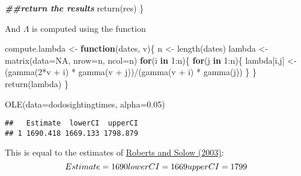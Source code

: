 \documentclass[
]{article}
\newenvironment{Shaded}{\begin{snugshade}}{\end{snugshade}}
\newcommand{\AttributeTok}[1]{\textcolor[rgb]{0.77,0.63,0.00}{#1}}
\newcommand{\ConstantTok}[1]{\textcolor[rgb]{0.00,0.00,0.00}{#1}}
\newcommand{\ControlFlowTok}[1]{\textcolor[rgb]{0.13,0.29,0.53}{\textbf{#1}}}
\newcommand{\DecValTok}[1]{\textcolor[rgb]{0.00,0.00,0.81}{#1}}
\newcommand{\DocumentationTok}[1]{\textcolor[rgb]{0.56,0.35,0.01}{\textbf{\textit{#1}}}}
\newcommand{\FloatTok}[1]{\textcolor[rgb]{0.00,0.00,0.81}{#1}}
\newcommand{\FunctionTok}[1]{\textcolor[rgb]{0.00,0.00,0.00}{#1}}
\newcommand{\NormalTok}[1]{#1}
\newcommand{\OtherTok}[1]{\textcolor[rgb]{0.56,0.35,0.01}{#1}}
\newcommand{\SpecialCharTok}[1]{\textcolor[rgb]{0.00,0.00,0.00}{#1}}
\begin{document}
\begin{Shaded}
\begin{Highlighting}[]
    \DocumentationTok{\#\#return the results}
    \FunctionTok{return}\NormalTok{(res)}
\NormalTok{\}}
\end{Highlighting}
\end{Shaded}

And \(\Lambda\) is computed using the function

\begin{Shaded}
\begin{Highlighting}[]
\NormalTok{compute.lambda }\OtherTok{\textless{}{-}} \ControlFlowTok{function}\NormalTok{(dates, v)\{}
\NormalTok{  n      }\OtherTok{\textless{}{-}} \FunctionTok{length}\NormalTok{(dates)}
\NormalTok{  lambda }\OtherTok{\textless{}{-}} \FunctionTok{matrix}\NormalTok{(}\AttributeTok{data=}\ConstantTok{NA}\NormalTok{, }\AttributeTok{nrow=}\NormalTok{n, }\AttributeTok{ncol=}\NormalTok{n)}
  \ControlFlowTok{for}\NormalTok{(i }\ControlFlowTok{in} \DecValTok{1}\SpecialCharTok{:}\NormalTok{n)\{}
    \ControlFlowTok{for}\NormalTok{(j }\ControlFlowTok{in} \DecValTok{1}\SpecialCharTok{:}\NormalTok{n)\{}
\NormalTok{      lambda[i,j] }\OtherTok{\textless{}{-}}\NormalTok{ (}\FunctionTok{gamma}\NormalTok{(}\DecValTok{2}\SpecialCharTok{*}\NormalTok{v }\SpecialCharTok{+}\NormalTok{ i) }\SpecialCharTok{*} \FunctionTok{gamma}\NormalTok{(v }\SpecialCharTok{+}\NormalTok{ j))}\SpecialCharTok{/}\NormalTok{(}\FunctionTok{gamma}\NormalTok{(v }\SpecialCharTok{+}\NormalTok{ i) }\SpecialCharTok{*} \FunctionTok{gamma}\NormalTok{(j))}
\NormalTok{    \}}
\NormalTok{  \}}
  \FunctionTok{return}\NormalTok{(lambda)}
\NormalTok{\}}
\end{Highlighting}
\end{Shaded}

\begin{Shaded}
\begin{Highlighting}[]
\FunctionTok{OLE}\NormalTok{(}\AttributeTok{data=}\NormalTok{dodosightingtimes, }\AttributeTok{alpha=}\FloatTok{0.05}\NormalTok{)}
\end{Highlighting}
\end{Shaded}

\begin{verbatim}
##   Estimate  lowerCI  upperCI
## 1 1690.418 1669.133 1798.879
\end{verbatim}

This is equal to the estimates of
\href{https://www.nature.com/articles/426245a}{Roberts and Solow
(2003)}: \[
Estimate = 1690\\
lowerCI = 1669\\  
upperCI = 1799\\
\]
\end{document}
